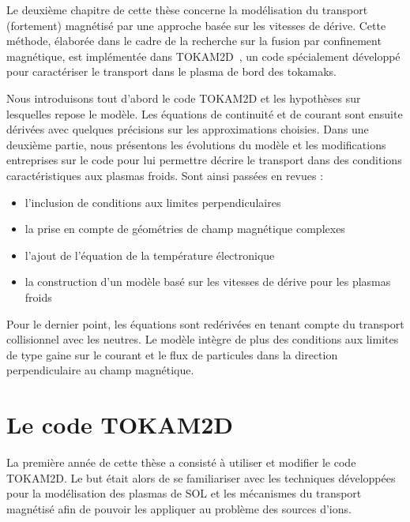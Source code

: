 \begin{refsection}
Le deuxième chapitre de cette thèse concerne la modélisation du transport
(fortement) magnétisé par une approche basée sur les vitesses de dérive. Cette
méthode, élaborée dans le cadre de la recherche sur la fusion par
confinement magnétique, est implémentée dans TOKAM2D~\cite{Sarazin}, un code 
spécialement développé pour caractériser le transport dans le plasma de bord
des tokamaks.

Nous introduisons tout d'abord le code TOKAM2D et les hypothèses sur
lesquelles repose le modèle. Les équations de continuité et de
courant sont ensuite dérivées avec quelques précisions sur les approximations
choisies.
Dans une deuxième partie, nous présentons les évolutions du
modèle et les modifications entreprises sur le code pour lui
permettre décrire le transport dans des conditions caractéristiques aux plasmas
froids. Sont ainsi passées en revues :

\begin{itemize}
  \item l'inclusion de conditions aux limites
perpendiculaires
\item la prise en compte de géométries de champ magnétique complexes
\item l'ajout de l'équation de la
température électronique
\item la construction d'un modèle basé sur les vitesses de dérive pour les plasmas froids
\end{itemize}

Pour le dernier point, les équations sont redérivées en tenant
compte du transport collisionnel avec les neutres. Le modèle intègre de plus des
conditions aux limites de type gaine sur le courant et le flux de particules
dans la direction perpendiculaire au champ magnétique.



\section{Le code TOKAM2D}

La première année de cette thèse a consisté à utiliser et modifier le
code {TOKAM2D}. Le but était alors de se familiariser avec les
techniques développées pour la modélisation des plasmas
de SOL et les mécanismes du transport magnétisé afin
de pouvoir les appliquer au problème des sources d'ions. 


\end{refsection}

